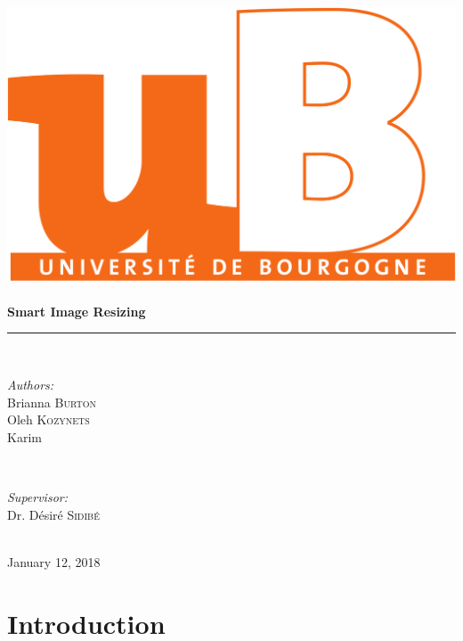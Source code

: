 \documentclass[11pt,a4paper,table]{article}
\begin{document}
\begin{titlepage}
\vspace*{\fill}
\newcommand{\HRule}{\rule{\linewidth}{0.5mm}}

\center

\includegraphics[scale=0.1]{logo.png}\\[1cm]
\\[0.5cm]

{ \Large \bfseries Smart Image Resizing}\\[0.4cm]
\HRule \\[1.5cm]

\begin{minipage}{0.4\textwidth}
\begin{flushleft} \large
\emph{Authors:}\\
Brianna \textsc{Burton}\\
Oleh \textsc{Kozynets}\\
Karim \textsc{}\\
\end{flushleft}
\end{minipage}
~
\begin{minipage}{0.4\textwidth}
\begin{flushright} \large
\emph{Supervisor:} \\
Dr. D\'esir\'e \textsc{Sidib\'e}\\
\end{flushright}
\end{minipage}\\[2cm]

{\large January 12, 2018}\\[1cm]
\vspace*{\fill}

\end{titlepage}

\setcounter{page}{2}

\section{Introduction}


\pagebreak

%
%
\pagebreak
\end{document}
